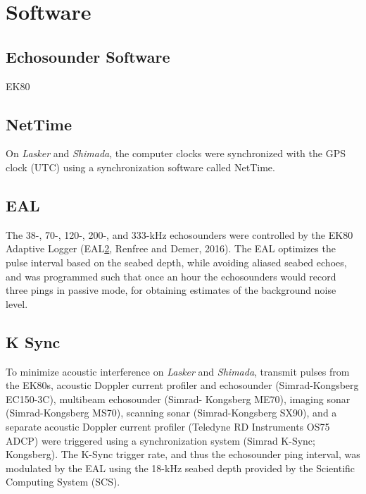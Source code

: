 \documentclass[
  letterpaper,
  oneside,
  open=any]{scrbook}
\begin{document}
\section{Software}\label{software}

\subsection{Echosounder Software}\label{echosounder-software}

EK80

\subsection{NetTime}\label{nettime}

On \emph{Lasker} and \emph{Shimada}, the computer clocks were
synchronized with the GPS clock (UTC) using a synchronization software
called NetTime.

\subsection{EAL}\label{eal}

The 38-, 70-, 120-, 200-, and 333-kHz echosounders were controlled by
the EK80 Adaptive Logger
(EAL\href{file:///C:/Users/alice.beittel/Downloads/2024Renfree.docx\#_bookmark7}{2},
Renfree and Demer, 2016). The EAL optimizes the pulse interval based on
the seabed depth, while avoiding aliased seabed echoes, and was
programmed such that once an hour the echosounders would record three
pings in passive mode, for obtaining estimates of the background noise
level.

\subsection{K Sync}\label{k-sync}

To minimize acoustic interference on \emph{Lasker} and \emph{Shimada},
transmit pulses from the EK80s, acoustic Doppler current profiler and
echosounder (Simrad-Kongsberg EC150-3C), multibeam echosounder (Simrad-
Kongsberg ME70), imaging sonar (Simrad-Kongsberg MS70), scanning sonar
(Simrad-Kongsberg SX90), and a separate acoustic Doppler current
profiler (Teledyne RD Instruments OS75 ADCP) were triggered using a
synchronization system (Simrad K-Sync; Kongsberg). The K-Sync trigger
rate, and thus the echosounder ping interval, was modulated by the EAL
using the 18-kHz seabed depth provided by the Scientific Computing
System (SCS).
\end{document}
